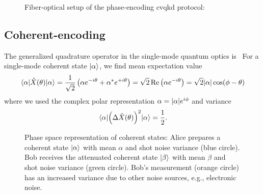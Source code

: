 \begin{figure}[htb]
	\centering
	
	\caption{Fiber-optical setup of the phase-encoding \gls{cvqkd} protocol:}
\end{figure}

\FloatBarrier
\subsection{Coherent-encoding}

The generalized quadrature operator in the single-mode quantum optics is~
For a single-mode coherent state $\ket{\alpha}$, we find mean expectation value
\begin{equation}
	\expval{\hat{X}(\theta)}{\alpha}
	=
	\frac{1}{\sqrt{2}}
	\left(
		\alpha
		e^{-i\theta}
		+
		\alpha^*
		e^{+i\theta}
	\right)
	=
	\sqrt{2}
	\operatorname{\operatorname{Re}}\left(
		\alpha
		e^{-i\theta}
	\right)
	=
	\sqrt{2}
	\abs{\alpha}
	\cos(\phi-\theta)
\end{equation}
where we used the complex polar representation $\alpha=\abs{\alpha}e^{i\phi}$ and variance~\cite[p.~59]{Barnett2002}
\begin{equation}
	\expval{\left(\Delta\hat{X}(\theta)\right)^2}{\alpha}
	=
	\frac{1}{2}
	.
\end{equation}




\begin{figure}[htb]
	\centering
	
	\caption{Phase space representation of coherent states: Alice prepares a coherent state $\ket{\alpha}$ with mean $\alpha$ and shot noise variance (blue circle). Bob receives the attenuated coherent state $\ket{\beta}$ with mean $\beta$ and shot noise variance (green circle). Bob's measurement (orange circle) has an increased variance due to other noise sources, e.g., electronic noise.}
\end{figure}

